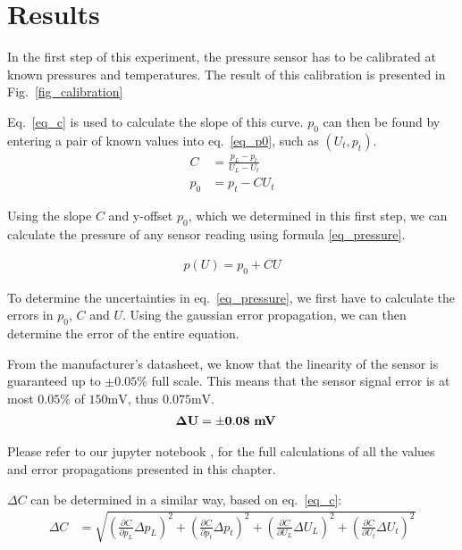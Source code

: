 \section{Results}\label{sec_results}

    In the first step of this experiment, the pressure sensor has to be calibrated at known pressures and temperatures.
    The result of this calibration is presented in Fig.~\ref{fig_calibration}

    

    Eq.~\ref{eq_c} is used to calculate the slope of this curve. $p_0$ can then be found by entering a pair of known values into eq.~\ref{eq_p0}, such as $(U_t,p_t)$.
    \begin{align}
        C &= \frac{p_L - p_t}{U_L - U_t} \label{eq_c}\\
        p_0 &= p_t - C U_t \label{eq_p0}
    \end{align}

    Using the slope $C$ and y-offset $p_0$, which we determined in this first step, we can calculate the pressure
    of any sensor reading using formula \ref{eq_pressure}.

    \begin{align}
        p(U) = p_0 + CU \label{eq_pressure}
    \end{align}

    To determine the uncertainties in eq.~\ref{eq_pressure}, we first have to calculate the errors in $p_0$, $C$ and $U$.
    Using the gaussian error propagation, we can then determine the error of the entire equation.


    From the manufacturer's datasheet, we know that the linearity of the sensor is guaranteed up to $\pm 0.05\%$ full scale. %
    This means that the sensor signal error is at most $0.05\%$ of $150\si{\milli\volt}$, thus $0.075\si{\milli\volt}$.
    \begin{align}
        \bf \Delta U &= \bf \pm 0.08 ~\si{\bf\milli\volt} \label{dlta_u}
    \end{align}

    Please refer to our jupyter notebook \cite{GitHub}, for the full calculations of all the values and error propagations presented in this chapter.   %

    $\Delta C$ can be determined in a similar way, based on eq.~\ref{eq_c}:
    \begin{align}
        \Delta C &= \sqrt{ \left(\frac{\partial C}{\partial p_L} \Delta p_L \right)^2 +
                        \left(\frac{\partial C}{\partial p_t} \Delta p_t \right)^2 +
                        \left(\frac{\partial C}{\partial U_L} \Delta U_L \right)^2 +
                        \left(\frac{\partial C}{\partial U_t} \Delta U_t \right)^2 } \label{eq_dlta_c}
    \end{align}

